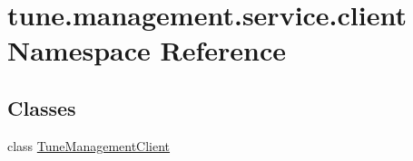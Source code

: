 \hypertarget{namespacetune_1_1management_1_1service_1_1client}{\section{tune.\-management.\-service.\-client Namespace Reference}
\label{namespacetune_1_1management_1_1service_1_1client}
}
\subsection*{Classes}
\begin{DoxyCompactItemize}
\item 
class \hyperlink{classtune_1_1management_1_1service_1_1client_1_1TuneManagementClient}{Tune\-Management\-Client}
\end{DoxyCompactItemize}
